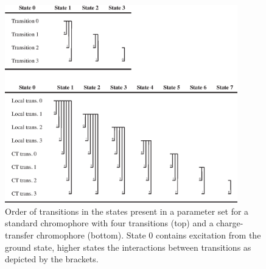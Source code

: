 \documentclass[11pt, letterpaper]{article}
\begin{document}
\begin{figure}
\enlargethispage{3em}
\centering
\includegraphics[width=0.9\textwidth]{figures/Parameter-set-transitions.eps}
\caption{Order of transitions in the states present in a parameter set for a standard chromophore with four transitions (top) and a charge-transfer chromophore (bottom). State 0 contains excitation from the ground state, higher states the interactions between transitions as depicted by the brackets.}
\label{Fig:ParameterSetStates}
\end{figure}
\end{document}
